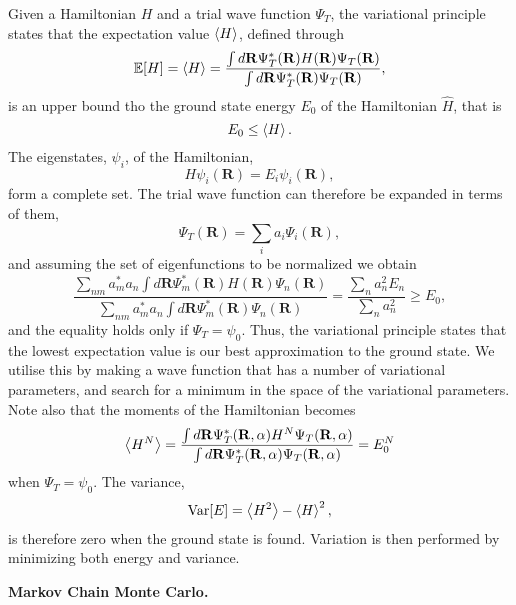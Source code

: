 Given a Hamiltonian $H$ and a trial wave function $\Psi_T$, the variational principle states that the expectation value $\expval{H}$, defined through
\begin{equation}
    \mathbb{E}[H]=\expval{H}= \frac{\int d\mathbf{R}\Psi_T^*(\mathbf{R})H(\mathbf{R})\Psi_T(\mathbf{R})}{\int d\mathbf{R}\Psi_T^*(\mathbf{R})\Psi_T(\mathbf{R})}, 
\end{equation}
is an upper bound tho the ground state energy $E_0$ of the Hamiltonian $\hat{H}$, that is 
\begin{equation}
    E_0 \leq \expval{H}.
\end{equation}
The eigenstates, $\psi_i$, of the Hamiltonian,
\begin{equation}
    H\psi_i(\mathbf{R}) = E_i\psi_i(\mathbf{R}), 
\end{equation}
form a complete set. The trial wave function can therefore be expanded in terms of them,
\begin{equation}
    \Psi_T(\mathbf{R}) = \sum_i a_i\Psi_i(\mathbf{R}), 
\end{equation}
and assuming the set of eigenfunctions to be normalized we obtain
\begin{equation}
    \frac{\sum_{nm}a_m^*a_n\int d\mathbf{R}\Psi_m^*(\mathbf{R})H(\mathbf{R})\Psi_n(\mathbf{R})}{\sum_{nm}a_m^*a_n\int d\mathbf{R}\Psi_m^*(\mathbf{R})\Psi_n(\mathbf{R})} = \frac{\sum_n a_n^2E_n}{\sum_n a_n^2} \geq E_0, 
\end{equation}
and the equality holds only if $\Psi_T = \psi_0$. Thus, the variational principle states that the lowest expectation value is our best approximation to the ground state. We utilise this by making a wave function that has a number of variational parameters, and search for a minimum in the space of the variational parameters. Note also that the moments of the Hamiltonian becomes
\begin{equation}
    \expval{H^N} = \frac{\int d\mathbf{R}\Psi_T^*(\mathbf{R}, \mathbf{\alpha})H^N\Psi_T(\mathbf{R},\mathbf{\alpha})}{\int d\mathbf{R}\Psi_T^*(\mathbf{R}, \mathbf{\alpha})\Psi_T(\mathbf{R}, \mathbf{\alpha})} = E_0^N
\end{equation}
when $\Psi_T=\psi_0$. The variance, 
\begin{equation}
    \text{Var}[E] = \expval{H^2}-\expval{H}^2, 
\end{equation}
is therefore zero when the ground state is found. Variation is then performed by minimizing both energy and variance. 

\textbf{Markov Chain Monte Carlo.}

